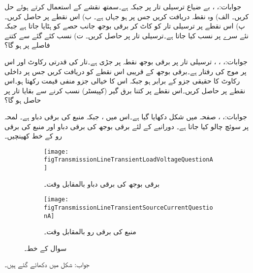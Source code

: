 جوابات:، ، 
بے ضیاع ترسیلی تار پر  جبکہ  ہے۔سمتھ نقشے کے استعمال کرتے ہوئے حل کریں۔ الف) وہ نقطہ دریافت کریں جس پر  ہو جہاں  ہے۔ ب) اس نقطے پر  حاصل کریں۔ پ) اس نقطے پر ترسیلی تار کو کاٹ کر برقی بوجھ جانب حصے کو ہٹایا جاتا ہے جبکہ نئے سرے پر   نسب کیا جاتا ہے۔ترسیلی تار پر  حاصل کریں۔ ت) نسب کئے گئے  سے کتنے فاصلے پر  ہو گا؟

جوابات:، ، ، 
ترسیلی تار پر  برقی بوجھ  نقطہ   پر جڑی ہے۔تار کی قدرتی رکاوٹ  اور اس پر موج کی رفتار  ہے۔برقی بوجھ کے قریبی اس نقطے کو دریافت کریں جس پر داخلی رکاوٹ کا حقیقی جزو  کے برابر ہو جبکہ اس کا خیالی جزو منفی قیمت رکھتا ہو۔اس نقطے پر 
 حاصل کریں۔اس نقطے پر کتنا برق گیر (کپیسٹر)  نسب کرنے سے بقایا تار پر  حاصل ہو گا؟ 

جوابات:، ، 
صفحہ  میں شکل  دکھایا گیا ہے۔اس میں ،  جبکہ منبع کی برقی دباو  ہے۔ لمحہ  پر سوئچ چالو کیا جاتا ہے۔ دورانیے کے لئے برقی بوجھ  کی برقی دباو اور  منبع کی برقی رو کے خط کھینچیں۔

\begin{figure}
\centering
\begin{subfigure}{0.9\textwidth}
\centering
\texttt{[image: figTransmissionLineTransientLoadVoltageQuestionA]}
\caption{ برقی بوجھ کی برقی دباو بالمقابل وقت۔}
\label{شکل_ترسیلی_جواب_سوال_الف}
\end{subfigure}%

\begin{subfigure}{0.9\textwidth}
\centering
\texttt{[image: figTransmissionLineTransientSourceCurrentQuestionA]}
\caption{منبع کی برقی رو بالمقابل وقت۔}
\label{شکل_ترسیلی_جواب_منبع_رو_سوال_الف}
\end{subfigure}%
\caption{سوال  کے خط۔}
\label{شکل_سوال_ترسیلی_سوال_الف}
\end{figure}
جواب: شکل  میں دکھائے گئے ہیں۔

